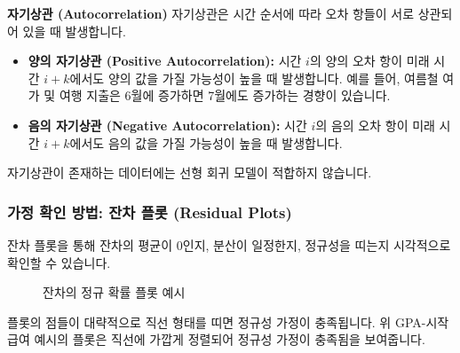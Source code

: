 \documentclass[11pt,a4paper]{article}
\theoremstyle{definition}
\begin{document}
\begin{cautionbox}
\textbf{자기상관 (Autocorrelation)}
자기상관은 시간 순서에 따라 오차 항들이 서로 상관되어 있을 때 발생합니다.
\begin{itemize}
    \item \textbf{양의 자기상관 (Positive Autocorrelation):} 시간 $i$의 양의 오차 항이 미래 시간 $i+k$에서도 양의 값을 가질 가능성이 높을 때 발생합니다. 예를 들어, 여름철 여가 및 여행 지출은 6월에 증가하면 7월에도 증가하는 경향이 있습니다.
    \item \textbf{음의 자기상관 (Negative Autocorrelation):} 시간 $i$의 음의 오차 항이 미래 시간 $i+k$에서도 음의 값을 가질 가능성이 높을 때 발생합니다.
\end{itemize}
자기상관이 존재하는 데이터에는 선형 회귀 모델이 적합하지 않습니다.
\end{cautionbox}

\subsubsection{가정 확인 방법: 잔차 플롯 (Residual Plots)}
잔차 플롯을 통해 잔차의 평균이 0인지, 분산이 일정한지, 정규성을 띠는지 시각적으로 확인할 수 있습니다.

\begin{figure}[h!]
    \centering
    \caption{잔차의 정규 확률 플롯 예시}
    \label{fig:residual_normal_plot}
\end{figure}
\begin{tcolorbox}[colback=lightblue,colframe=darkblue,title={정규성 가정 확인}]
플롯의 점들이 대략적으로 직선 형태를 띠면 정규성 가정이 충족됩니다. 위 GPA-시작 급여 예시의 플롯은 직선에 가깝게 정렬되어 정규성 가정이 충족됨을 보여줍니다.
\end{tcolorbox}
\end{document}

